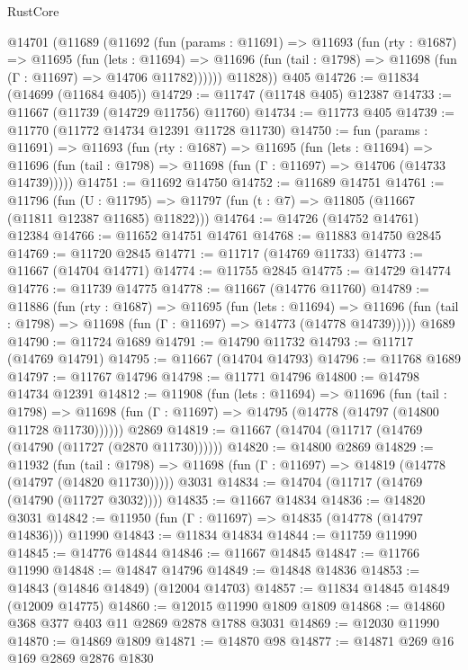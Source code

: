 \begin{lexlean}{RustCore}
\begin{coremodule}
    @14701
      (@11689
        (@11692
          (fun (params : @11691) =>
          @11693
            (fun (rty : @1687) =>
            @11695
              (fun (lets : @11694) =>
              @11696 (fun (tail : @1798) => @11698 (fun (Γ : @11697) => @14706 @11782))))))
        @11828))
    @405
@14726 := @11834 (@14699 (@11684 @405))
@14729 := @11747 (@11748 @405) @12387
@14733 := @11667 (@11739 (@14729 @11756) @11760)
@14734 := @11773 @405
@14739 := @11770 (@11772 @14734 @12391 @11728 @11730)
@14750 := fun (params : @11691) =>
  @11693
    (fun (rty : @1687) =>
    @11695
      (fun (lets : @11694) =>
      @11696 (fun (tail : @1798) => @11698 (fun (Γ : @11697) => @14706 (@14733 @14739)))))
@14751 := @11692 @14750
@14752 := @11689 @14751
@14761 := @11796
    (fun (U : @11795) => @11797 (fun (t : @7) => @11805 (@11667 (@11811 @12387 @11685) @11822)))
@14764 := @14726 (@14752 @14761) @12384
@14766 := @11652 @14751 @14761
@14768 := @11883 @14750 @2845
@14769 := @11720 @2845
@14771 := @11717 (@14769 @11733)
@14773 := @11667 (@14704 @14771)
@14774 := @11755 @2845
@14775 := @14729 @14774
@14776 := @11739 @14775
@14778 := @11667 (@14776 @11760)
@14789 := @11886
    (fun (rty : @1687) =>
    @11695
      (fun (lets : @11694) =>
      @11696 (fun (tail : @1798) => @11698 (fun (Γ : @11697) => @14773 (@14778 @14739)))))
    @1689
@14790 := @11724 @1689
@14791 := @14790 @11732
@14793 := @11717 (@14769 @14791)
@14795 := @11667 (@14704 @14793)
@14796 := @11768 @1689
@14797 := @11767 @14796
@14798 := @11771 @14796
@14800 := @14798 @14734 @12391
@14812 := @11908
    (fun (lets : @11694) =>
    @11696
      (fun (tail : @1798) =>
      @11698 (fun (Γ : @11697) => @14795 (@14778 (@14797 (@14800 @11728 @11730))))))
    @2869
@14819 := @11667 (@14704 (@11717 (@14769 (@14790 (@11727 (@2870 @11730))))))
@14820 := @14800 @2869
@14829 := @11932
    (fun (tail : @1798) => @11698 (fun (Γ : @11697) => @14819 (@14778 (@14797 (@14820 @11730)))))
    @3031
@14834 := @14704 (@11717 (@14769 (@14790 (@11727 @3032))))
@14835 := @11667 @14834
@14836 := @14820 @3031
@14842 := @11950 (fun (Γ : @11697) => @14835 (@14778 (@14797 @14836))) @11990
@14843 := @11834 @14834
@14844 := @11759 @11990
@14845 := @14776 @14844
@14846 := @11667 @14845
@14847 := @11766 @11990
@14848 := @14847 @14796
@14849 := @14848 @14836
@14853 := @14843 (@14846 @14849) (@12004 @14703)
@14857 := @11834 @14845 @14849 (@12009 @14775)
@14860 := @12015 @11990 @1809 @1809
@14868 := @14860 @368 @377 @403 @11 @2869 @2878 @1788 @3031
@14869 := @12030 @11990
@14870 := @14869 @1809
@14871 := @14870 @98
@14877 := @14871 @269 @16 @169 @2869 @2876 @1830

\end{coremodule}
\end{lexlean}

